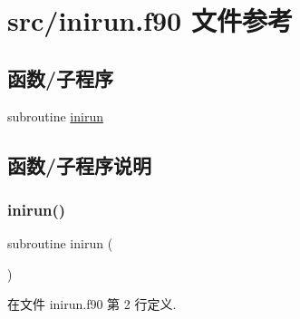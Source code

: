 \hypertarget{inirun_8f90}{}\section{src/inirun.f90 文件参考}
\label{inirun_8f90}
\subsection*{函数/子程序}
\begin{DoxyCompactItemize}
\item 
subroutine \mbox{\hyperlink{inirun_8f90_a11a85c70de57335cf3725d8b50abf692}{inirun}}
\end{DoxyCompactItemize}


\subsection{函数/子程序说明}
\mbox{\label{inirun_8f90_a11a85c70de57335cf3725d8b50abf692}} 
\subsubsection{\texorpdfstring{inirun()}{inirun()}}
{\footnotesize\ttfamily subroutine inirun (\begin{DoxyParamCaption}{ }\end{DoxyParamCaption})}



在文件 inirun.\+f90 第 2 行定义.

